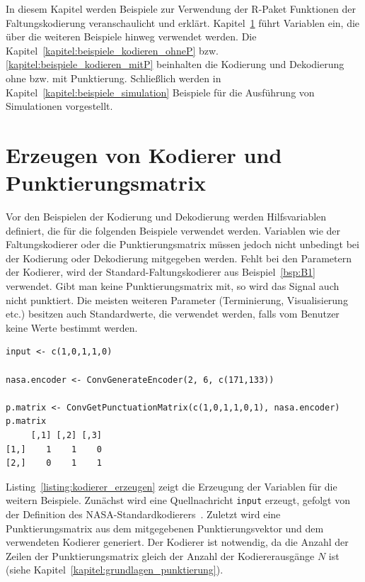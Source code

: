 In diesem Kapitel werden Beispiele zur Verwendung der R-Paket Funktionen der Faltungskodierung veranschaulicht und erklärt. Kapitel~\ref{kapitel:beispiele_kodierer} führt Variablen ein, die über die weiteren Beispiele hinweg verwendet werden. Die Kapitel~\ref{kapitel:beispiele_kodieren_ohneP} bzw. \ref{kapitel:beispiele_kodieren_mitP} beinhalten die Kodierung und Dekodierung ohne bzw. mit Punktierung. Schließlich werden in Kapitel~\ref{kapitel:beispiele_simulation} Beispiele für die Ausführung von Simulationen vorgestellt. 

\section{Erzeugen von Kodierer und Punktierungsmatrix}
\label{kapitel:beispiele_kodierer}
Vor den Beispielen der Kodierung und Dekodierung werden Hilfsvariablen definiert, die für die folgenden Beispiele verwendet werden. Variablen wie der Faltungskodierer oder die Punktierungsmatrix müssen jedoch nicht unbedingt bei der Kodierung oder Dekodierung mitgegeben werden. Fehlt bei den Parametern der Kodierer, wird der Standard-Faltungskodierer aus Beispiel~\ref{bsp:B1} verwendet. Gibt man keine Punktierungsmatrix mit, so wird das Signal auch nicht punktiert. Die meisten weiteren Parameter (Terminierung, Visualisierung etc.) besitzen auch Standardwerte, die verwendet werden, falls vom Benutzer keine Werte bestimmt werden.
\begin{lstlisting}[caption=Erzeugung von Kodierer und Punktierungsmatrix, label={listing:kodierer_erzeugen}, float=!th]
input <- c(1,0,1,1,0)
 
nasa.encoder <- ConvGenerateEncoder(2, 6, c(171,133))

p.matrix <- ConvGetPunctuationMatrix(c(1,0,1,1,0,1), nasa.encoder)
p.matrix
     [,1] [,2] [,3]
[1,]    1    1    0
[2,]    0    1    1
\end{lstlisting}
Listing~\ref{listing:kodierer_erzeugen} zeigt die Erzeugung der Variablen für die weitern Beispiele. Zunächst wird eine Quellnachricht \texttt{input} erzeugt, gefolgt von der Definition des NASA-Standardkodierers~\cite[S. 90]{morelos2006art}. Zuletzt wird eine Punktierungsmatrix aus dem mitgegebenen Punktierungsvektor und dem verwendeten Kodierer generiert. Der Kodierer ist notwendig, da die Anzahl der Zeilen der Punktierungsmatrix gleich der Anzahl der Kodiererausgänge $N$ ist (siehe Kapitel~\ref{kapitel:grundlagen_punktierung}).

